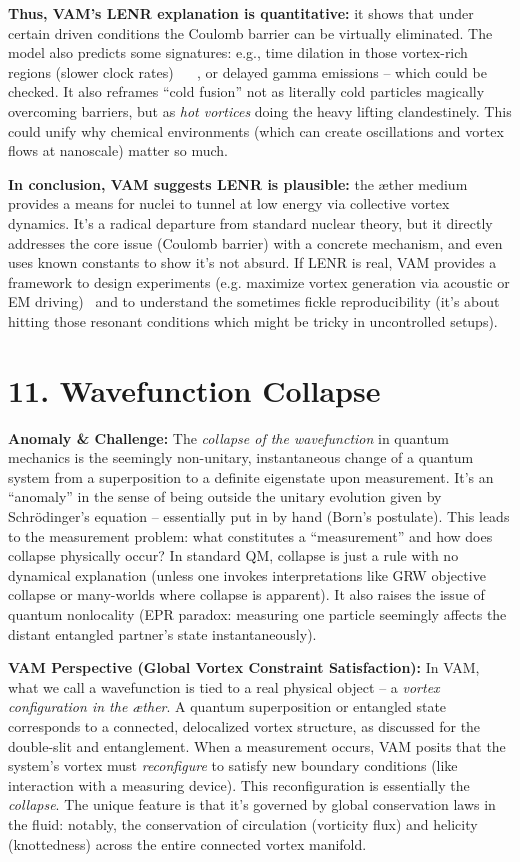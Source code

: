 \documentclass[a4paper, aps,preprint,superscriptaddress, 12pt]{revtex4}
\begin{document}
\textbf{Thus, VAM’s LENR explanation is quantitative:} it shows that under certain driven conditions the Coulomb barrier can be virtually eliminated. The model also predicts some signatures: e.g., time dilation in those vortex-rich regions (slower clock rates)~\cite{Iskandarani2025a} ~\cite{Iskandarani2025a} , or delayed gamma emissions – which could be checked. It also reframes “cold fusion” not as literally cold particles magically overcoming barriers, but as \textit{hot vortices} doing the heavy lifting clandestinely. This could unify why chemical environments (which can create oscillations and vortex flows at nanoscale) matter so much.


\textbf{In conclusion, VAM suggests LENR is plausible:} the æther medium provides a means for nuclei to tunnel at low energy via collective vortex dynamics. It’s a radical departure from standard nuclear theory, but it directly addresses the core issue (Coulomb barrier) with a concrete mechanism, and even uses known constants to show it’s not absurd. If LENR is real, VAM provides a framework to design experiments (e.g. maximize vortex generation via acoustic or EM driving)~\cite{Iskandarani2025a}  and to understand the sometimes fickle reproducibility (it’s about hitting those resonant conditions which might be tricky in uncontrolled setups).


\section*{11. Wavefunction Collapse}

\textbf{Anomaly \& Challenge: } The \textit{collapse of the wavefunction} in quantum mechanics is the seemingly non-unitary, instantaneous change of a quantum system from a superposition to a definite eigenstate upon measurement. It’s an “anomaly” in the sense of being outside the unitary evolution given by Schrödinger’s equation – essentially put in by hand (Born’s postulate). This leads to the measurement problem: what constitutes a “measurement” and how does collapse physically occur? In standard QM, collapse is just a rule with no dynamical explanation (unless one invokes interpretations like GRW objective collapse or many-worlds where collapse is apparent). It also raises the issue of quantum nonlocality (EPR paradox: measuring one particle seemingly affects the distant entangled partner’s state instantaneously).


\textbf{VAM Perspective (Global Vortex Constraint Satisfaction):} In VAM, what we call a wavefunction is tied to a real physical object – a \textit{vortex configuration in the æther}. A quantum superposition or entangled state corresponds to a connected, delocalized vortex structure, as discussed for the double-slit and entanglement. When a measurement occurs, VAM posits that the system’s vortex must \textit{reconfigure} to satisfy new boundary conditions (like interaction with a measuring device). This reconfiguration is essentially the \textit{collapse}. The unique feature is that it’s governed by global conservation laws in the fluid: notably, the conservation of circulation (vorticity flux) and helicity (knottedness) across the entire connected vortex manifold.
\end{document}
